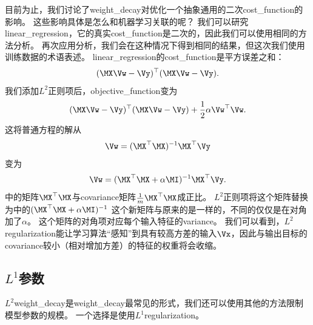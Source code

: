 目前为止，我们讨论了\gls{weight_decay}对优化一个抽象通用的二次\gls{cost_function}的影响。
这些影响具体是怎么和机器学习关联的呢？
我们可以研究\gls{linear_regression}，它的真实\gls{cost_function}是二次的，因此我们可以使用相同的方法分析。
再次应用分析，我们会在这种情况下得到相同的结果，但这次我们使用训练数据的术语表述。
\gls{linear_regression}的\gls{cost_function}是平方误差之和：
\begin{align}
 (\MX \Vw - \Vy)^\top (\MX \Vw - \Vy).
\end{align}
我们添加$L^2$正则项后，\gls{objective_function}变为
\begin{align}
  (\MX \Vw - \Vy)^\top (\MX \Vw - \Vy) + \frac{1}{2}\alpha \Vw^\top \Vw.
\end{align}
这将普通方程的解从
\begin{align}
\label{eq:716w}
  \Vw = (\MX^\top \MX)^{-1} \MX^\top \Vy
\end{align}
变为
\begin{align}
\label{eq:717mw}
   \Vw = (\MX^\top \MX + \alpha \MI)^{-1} \MX^\top \Vy .
\end{align}
中的矩阵$\MX^\top\MX$与\gls{covariance}矩阵$\frac{1}{m}\MX^\top\MX$成正比。
$L^2$正则项将这个矩阵替换为中的$ (\MX^\top \MX + \alpha \MI)^{-1}$
这个新矩阵与原来的是一样的，不同的仅仅是在对角加了$\alpha$。
这个矩阵的对角项对应每个输入特征的\gls{variance}。
我们可以看到，$L^2$\gls{regularization}能让学习算法``感知''到具有较高方差的输入$\Vx$，因此与输出目标的\gls{covariance}较小（相对增加方差）的特征的权重将会收缩。

\subsection{$L^1$参数}
\label{sec:l1_regularization}
$L^2$\gls{weight_decay}是\gls{weight_decay}最常见的形式，我们还可以使用其他的方法限制模型参数的规模。
一个选择是使用$L^1$\gls{regularization}。

